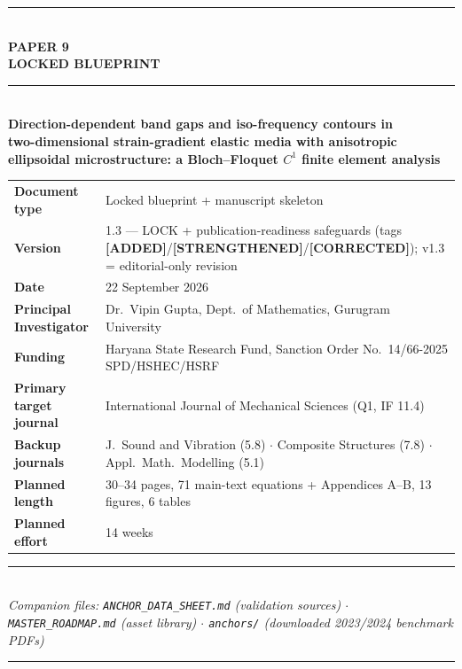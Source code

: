 \documentclass[11pt,a4paper]{article}
\newcommand{\ADDED}{{\color{addcol}\textbf{[ADDED]}}}
\newcommand{\STR}{{\color{strcol}\textbf{[STRENGTHENED]}}}
\newcommand{\COR}{{\color{corcol}\textbf{[CORRECTED]}}}
\begin{document}
\begin{titlepage}
\centering
\vspace*{0.6cm}
{\color{accent}\rule{\textwidth}{1.2pt}}\\[0.5cm]
{\Huge\bfseries\color{lockblue} PAPER 9}\\[0.35cm]
{\Large\bfseries LOCKED BLUEPRINT}\\[0.9cm]
{\color{accent}\rule{\textwidth}{0.6pt}}\\[1.1cm]

{\large\bfseries Direction-dependent band gaps and iso-frequency contours in\\[0.25cm]
two-dimensional strain-gradient elastic media with anisotropic\\[0.25cm]
ellipsoidal microstructure: a Bloch--Floquet $C^1$ finite element analysis}\\[1.3cm]

\begin{minipage}{0.86\textwidth}
\centering\footnotesize
\begin{tabular}{@{}>{\bfseries}p{3.5cm} p{9.6cm}@{}}
\textbf{Document type} & Locked blueprint + manuscript skeleton \\
\textbf{Version} & 1.3 --- LOCK + publication-readiness safeguards (tags \ADDED/\STR/\COR); v1.3 = editorial-only revision \\
\textbf{Date} & 22 September 2026 \\
\textbf{Principal Investigator} & Dr.\ Vipin Gupta, Dept.\ of Mathematics, Gurugram University \\
\textbf{Funding} & Haryana State Research Fund, Sanction Order No.\ 14/66-2025 SPD/HSHEC/HSRF \\
\textbf{Primary target journal} & International Journal of Mechanical Sciences (Q1, IF 11.4) \\
\textbf{Backup journals} & J.\ Sound and Vibration (5.8) $\cdot$ Composite Structures (7.8) $\cdot$ Appl.\ Math.\ Modelling (5.1) \\
\textbf{Planned length} & 30--34 pages, 71 main-text equations + Appendices A--B, 13 figures, 6 tables \\
\textbf{Planned effort} & 14 weeks \\
\end{tabular}
\end{minipage}

\vfill
{\color{accent}\rule{\textwidth}{0.6pt}}\\[0.35cm]
{\footnotesize\itshape Companion files: \texttt{ANCHOR\_DATA\_SHEET.md} (validation sources) $\cdot$
\texttt{MASTER\_ROADMAP.md} (asset library) $\cdot$
\texttt{anchors/} (downloaded 2023/2024 benchmark PDFs)}\\[0.3cm]
{\color{accent}\rule{\textwidth}{1.2pt}}
\end{titlepage}
\end{document}
